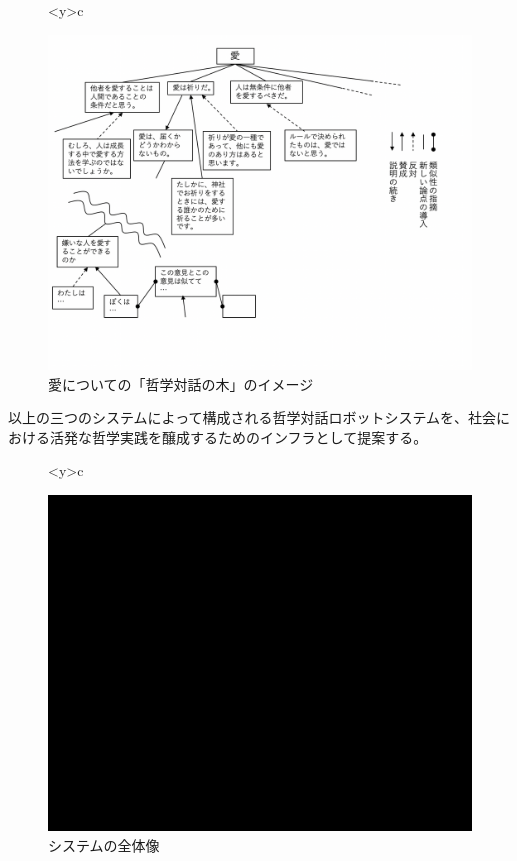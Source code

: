 \documentclass[9pt,b5j,twoside,twocolumn]{utarticle}
\begin{document}
\begin{figure}[h]
\centering
\begin{tabular}<y>{c}
\begin{minipage}[c]{0.68\hsize}
\centering
\includegraphics[scale=0.39]{system3}
\caption{愛についての「哲学対話の木」のイメージ}
\end{minipage}
\end{tabular}
\end{figure}


以上の三つのシステムによって構成される哲学対話ロボットシステムを、社会における活発な哲学実践を醸成するためのインフラとして提案する。
\begin{figure}[h]
\centering
\begin{tabular}<y>{c}
\centering
\begin{minipage}[c]{0.8\hsize}
\centering
\includegraphics[scale=0.55]{system2}
\caption{システムの全体像}
\end{minipage}
\end{tabular}
\end{figure}
\end{document}
